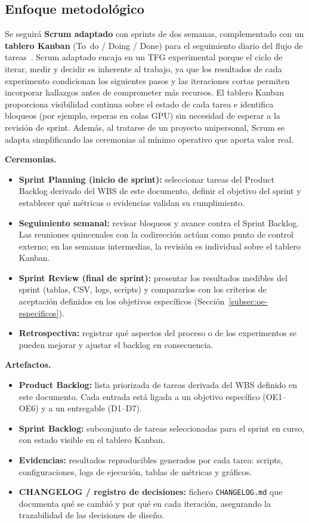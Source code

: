 \documentclass[11pt,a4paper]{article}
\begin{document}
\subsection{Enfoque metodológico}

Se seguirá \textbf{Scrum adaptado} con sprints de dos semanas, complementado con un \textbf{tablero Kanban} (To~do / Doing / Done) para el seguimiento diario del flujo de tareas~\cite{schwaber2020scrum}. Scrum adaptado encaja en un TFG experimental porque el ciclo de iterar, medir y decidir es inherente al trabajo, ya que los resultados de cada experimento condicionan los siguientes pasos y las iteraciones cortas permiten incorporar hallazgos antes de comprometer más recursos. El tablero Kanban proporciona visibilidad continua sobre el estado de cada tarea e identifica bloqueos (por ejemplo, esperas en colas GPU) sin necesidad de esperar a la revisión de sprint. Además, al tratarse de un proyecto unipersonal, Scrum se adapta simplificando las ceremonias al mínimo operativo que aporta valor real.

\textbf{Ceremonias.}
\begin{itemize}[nosep,leftmargin=*]
\item \textbf{Sprint Planning (inicio de sprint):} seleccionar tareas del Product Backlog derivado del WBS de este documento, definir el objetivo del sprint y establecer qué métricas o evidencias validan su cumplimiento.
\item \textbf{Seguimiento semanal:} revisar bloqueos y avance contra el Sprint Backlog. Las reuniones quincenales con la codirección actúan como punto de control externo; en las semanas intermedias, la revisión es individual sobre el tablero Kanban.
\item \textbf{Sprint Review (final de sprint):} presentar los resultados medibles del sprint (tablas, CSV, logs, scripts) y compararlos con los criterios de aceptación definidos en los objetivos específicos (Sección~\ref{subsec:oe-especificos}).
\item \textbf{Retrospectiva:} registrar qué aspectos del proceso o de los experimentos se pueden mejorar y ajustar el backlog en consecuencia.
\end{itemize}

\textbf{Artefactos.}
\begin{itemize}[nosep,leftmargin=*]
\item \textbf{Product Backlog:} lista priorizada de tareas derivada del WBS definido en este documento. Cada entrada está ligada a un objetivo específico (OE1--OE6) y a un entregable (D1--D7).
\item \textbf{Sprint Backlog:} subconjunto de tareas seleccionadas para el sprint en curso, con estado visible en el tablero Kanban.
\item \textbf{Evidencias:} resultados reproducibles generados por cada tarea: scripts, configuraciones, logs de ejecución, tablas de métricas y gráficos.
\item \textbf{CHANGELOG / registro de decisiones:} fichero \texttt{CHANGELOG.md} que documenta qué se cambió y por qué en cada iteración, asegurando la trazabilidad de las decisiones de diseño.
\end{itemize}
\end{document}
